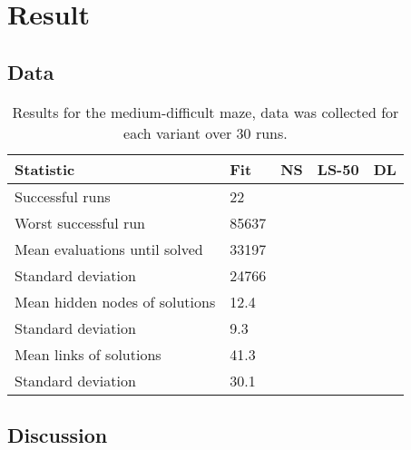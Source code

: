 \section{Result}
\label{sec:Result}

\subsection{Data}
\begin{table}[H]
    \centering
    \begin{tabular}{lllll}
    \toprule
    Statistic & \multicolumn{1}{l}{Fit} & \multicolumn{1}{l}{NS} & \multicolumn{1}{l}{LS-50} & \multicolumn{1}{l}{DL} \\
    \midrule
    Successful runs & 22 &  &  & \\
    Worst successful run & 85637 &  &  & \\
    \rowcolor[gray]{.9} Mean evaluations until solved & 33197 &  &  & \\
    Standard deviation & 24766  &  &  & \\
    \rowcolor[gray]{.9} Mean hidden nodes of solutions & 12.4 &  &  &  \\
    Standard deviation & 9.3 &  &  &  \\
    \rowcolor[gray]{.9} Mean links of solutions & 41.3  &  &  &  \\
    Standard deviation & 30.1  &  &  & \\
    \bottomrule
    \end{tabular}
    \caption{Results for the medium-difficult maze, data was collected for each variant over 30 runs.}
    \label{test}
\end{table}

\subsection{Discussion}

